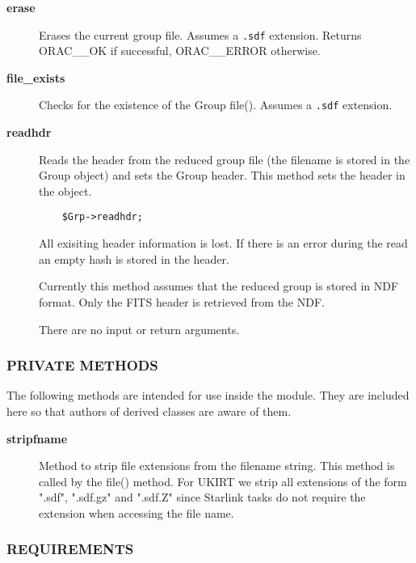 \begin{description}
\item[\textbf{erase}] \mbox{}

Erases the current group file. Assumes a \texttt{.sdf} extension.
Returns ORAC\_\_OK if successful, ORAC\_\_ERROR otherwise.

\item[\textbf{file\_exists}] \mbox{}

Checks for the existence of the Group file(). Assumes a \texttt{.sdf}
extension.

\item[\textbf{readhdr}] \mbox{}

Reads the header from the reduced group file (the filename is stored
in the Group object) and sets the Group header. This method sets the
header in the object.

\begin{verbatim}
    $Grp->readhdr;
\end{verbatim}


All exisiting header information is lost.  If there is an error during
the read an empty hash is stored in the header.



Currently this method assumes that the reduced group is stored in
NDF format. Only the FITS header is retrieved from the NDF.



There are no input or return arguments.

\end{description}
\subsubsection*{PRIVATE METHODS\label{ORAC::Group::NDF_PRIVATE_METHODS}}

The following methods are intended for use inside the module.
They are included here so that authors of derived classes are 
aware of them.

\begin{description}
\item[\textbf{stripfname}] \mbox{}

Method to strip file extensions from the filename string. This method
is called by the file() method. For UKIRT we strip all extensions of the
form ".sdf", ".sdf.gz" and ".sdf.Z" since Starlink tasks do not require
the extension when accessing the file name.

\end{description}
\subsubsection*{REQUIREMENTS\label{ORAC::Group::NDF_REQUIREMENTS}}

